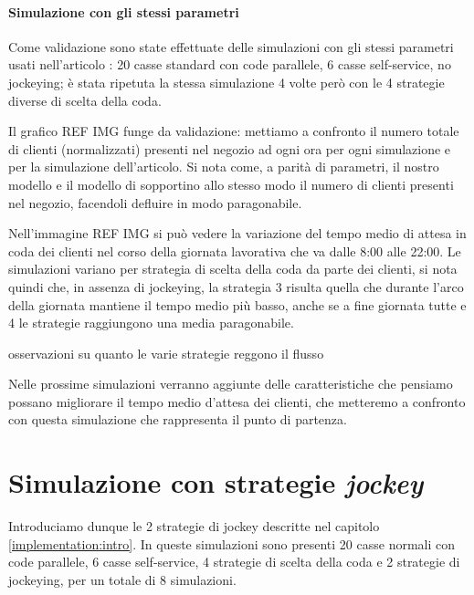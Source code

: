 \paragraph{Simulazione con gli stessi parametri}

Come validazione sono state effettuate delle simulazioni con gli stessi parametri usati nell'articolo \cite{article1}: 20 casse standard con code parallele, 6 casse self-service, no jockeying; è stata ripetuta la stessa simulazione 4 volte però con le 4 strategie diverse di scelta della coda.


Il grafico REF IMG funge da validazione: mettiamo a confronto il numero totale di clienti (normalizzati) presenti nel negozio ad ogni ora per ogni simulazione e per la simulazione dell'articolo. Si nota come, a parità di parametri, il nostro modello e il modello di \cite{article1} sopportino allo stesso modo il numero di clienti presenti nel negozio, facendoli defluire in modo paragonabile.


Nell'immagine REF IMG si può vedere la variazione del tempo medio di attesa in coda dei clienti nel corso della giornata lavorativa che va dalle 8:00 alle 22:00. Le simulazioni variano per strategia di scelta della coda da parte dei clienti, si nota quindi che, in assenza di jockeying, la strategia 3 risulta quella che durante l'arco della giornata mantiene il tempo medio più basso, anche se a fine giornata tutte e 4 le strategie raggiungono una media paragonabile.


osservazioni su quanto le varie strategie reggono il flusso

Nelle prossime simulazioni verranno aggiunte delle caratteristiche che pensiamo possano migliorare il tempo medio d'attesa dei clienti, che metteremo a confronto con questa simulazione che rappresenta il punto di partenza.

\section{Simulazione con strategie \textit{jockey}}

Introduciamo dunque le 2 strategie di jockey descritte nel capitolo \ref{implementation:intro}. In queste simulazioni sono presenti 20 casse normali con code parallele, 6 casse self-service, 4 strategie di scelta della coda e 2 strategie di jockeying, per un totale di 8 simulazioni.

